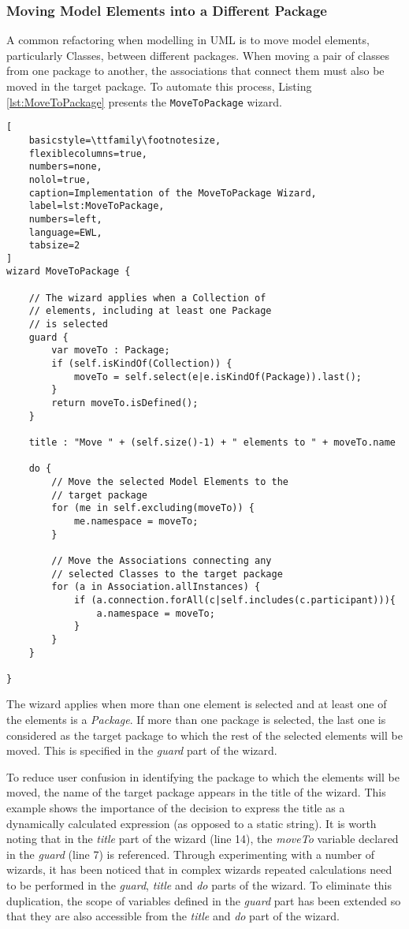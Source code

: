 \subsubsection{Moving Model Elements into a Different Package}
\label{sec:MoveToPackage}

A common refactoring when modelling in UML is to move model elements, particularly Classes, between different packages. When moving a pair of classes from one package to another, the associations that connect them must also be moved in the target package. To automate this process, Listing \ref{lst:MoveToPackage} presents the \texttt{MoveToPackage} wizard.

\begin{lstlisting}[
	basicstyle=\ttfamily\footnotesize, 
	flexiblecolumns=true, 
	numbers=none, 
	nolol=true, 
	caption=Implementation of the MoveToPackage Wizard, 
	label=lst:MoveToPackage, 
	numbers=left, 
	language=EWL, 
	tabsize=2
]
wizard MoveToPackage {
	
	// The wizard applies when a Collection of
	// elements, including at least one Package
	// is selected
	guard { 
		var moveTo : Package;
		if (self.isKindOf(Collection)) {
			moveTo = self.select(e|e.isKindOf(Package)).last();
		}
		return moveTo.isDefined();
	}
	
	title : "Move " + (self.size()-1) + " elements to " + moveTo.name
	
	do {
		// Move the selected Model Elements to the
		// target package
		for (me in self.excluding(moveTo)) {
			me.namespace = moveTo;
		}
		
		// Move the Associations connecting any
		// selected Classes to the target package
		for (a in Association.allInstances) {
			if (a.connection.forAll(c|self.includes(c.participant))){
				a.namespace = moveTo;
			}
		}
	}
	
}
\end{lstlisting}

The wizard applies when more than one element is selected and at least one of the elements is a \emph{Package}. If more than one package is selected, the last one is considered as the target package to which the rest of the selected elements will be moved. This is specified in the \emph{guard} part of the wizard.

To reduce user confusion in identifying the package to which the elements will be moved, the name of the target package appears in the title of the wizard. This example shows the importance of the decision to express the title as a dynamically calculated expression (as opposed to a static string). It is worth noting that in the \emph{title} part of the wizard (line 14), the \emph{moveTo} variable declared in the \emph{guard} (line 7) is referenced. Through experimenting with a number of wizards, it has been noticed that in complex wizards repeated calculations need to be performed in the \emph{guard}, \emph{title} and \emph{do} parts of the wizard. To eliminate this duplication, the scope of variables defined in the \emph{guard} part has been extended so that they are also accessible from the \emph{title} and \emph{do} part of the wizard.
